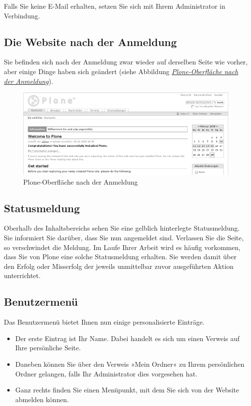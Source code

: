 \documentclass[a4paper,12pt,ngerman]{manual}
\begin{document}
Falls Sie keine E-Mail erhalten, setzen Sie sich mit Ihrem Administrator in
Verbindung.


\subsection{Die Website nach der Anmeldung}

Sie befinden sich nach der Anmeldung zwar wieder auf derselben Seite wie
vorher, aber einige Dinge haben sich geändert (siehe
Abbildung \hyperlink{fig-plonebase-logged-in}{\emph{Plone-Oberfläche nach der Anmeldung}}).
\hypertarget{fig-plonebase-logged-in}{}\begin{figure}[htbp]
\centering

\includegraphics[width=1.000\linewidth]{plonebase-logged-in.png}
\caption{Plone-Oberfläche nach der Anmeldung}\end{figure}


\subsection{Statusmeldung}

Oberhalb des Inhaltsbereichs sehen Sie eine gelblich hinterlegte
Statusmeldung. Sie informiert Sie darüber, dass Sie nun angemeldet
sind. Verlassen Sie die Seite, so verschwindet die Meldung. Im Laufe Ihrer
Arbeit wird es häufig vorkommen, dass Sie von Plone eine solche Statusmeldung
erhalten. Sie werden damit über den Erfolg oder Misserfolg der jeweils
unmittelbar zuvor ausgeführten Aktion unterrichtet.


\subsection{Benutzermenü}

Das Benutzermenü bietet Ihnen nun einige personalisierte Einträge.
\begin{itemize}
\item {} 
Der erste Eintrag ist Ihr Name. Dabei handelt es sich um einen Verweis
auf Ihre persönliche Seite.

\item {} 
Daneben können Sie über den Verweis »Mein Ordner« zu Ihrem
persönlichen Ordner gelangen, falls Ihr Administrator dies vorgesehen hat.

\item {} 
Ganz rechts finden Sie einen Menüpunkt, mit dem Sie sich von der Website
abmelden können.

\end{itemize}
\hypertarget{sec-persoenliche-seite}{}
\end{document}
